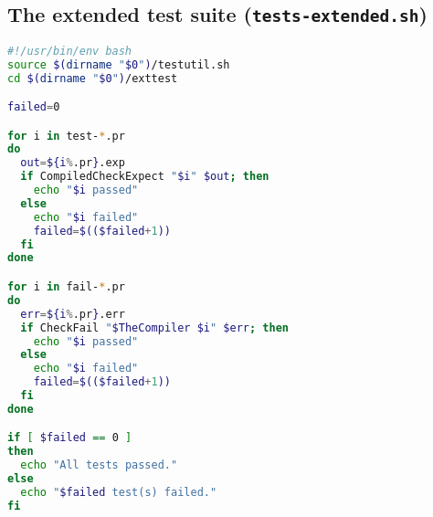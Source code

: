 \subsection{The extended test suite (\texttt{tests-extended.sh})}

\begin{lstlisting}[language=bash,backgroundcolor=\color{backgroundcolor}]
#!/usr/bin/env bash
source $(dirname "$0")/testutil.sh
cd $(dirname "$0")/exttest

failed=0

for i in test-*.pr
do
  out=${i%.pr}.exp
  if CompiledCheckExpect "$i" $out; then
    echo "$i passed"
  else
    echo "$i failed"
    failed=$(($failed+1))
  fi
done

for i in fail-*.pr
do
  err=${i%.pr}.err
  if CheckFail "$TheCompiler $i" $err; then
    echo "$i passed"
  else
    echo "$i failed"
    failed=$(($failed+1))
  fi
done

if [ $failed == 0 ]
then
  echo "All tests passed."
else
  echo "$failed test(s) failed."
fi
\end{lstlisting}
